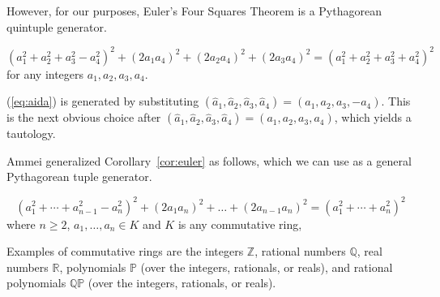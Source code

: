 \documentclass[12pt]{article}
\begin{document}
However, for our purposes, 
Euler's Four Squares Theorem is a Pythagorean quintuple generator.

\begin{corollary}
\label{cor:euler}
\begin{equation}
\label{eq:aida}
(a_1^2 + a_2^2 + a_3^2 - a_4^2)^2 + (2a_1a_4)^2 + (2a_2a_4)^2 + (2a_3a_4)^2
= (a_1^2 + a_2^2 + a_3^2 + a_4^2)^2
\end{equation}
for any integers $a_1,a_2,a_3,a_4$.
\end{corollary}
\prf
(\ref{eq:aida}) is generated by substituting 
$(\hat{a}_1,\hat{a}_2,\hat{a}_3,\hat{a}_4) = (a_1,a_2,a_3,-a_4)$.
This is the next obvious choice after 
$(\hat{a}_1,\hat{a}_2,\hat{a}_3,\hat{a}_4) = (a_1,a_2,a_3,a_4)$,
which yields a tautology.
\QED

Ammei \cite{dickson52} %
generalized Corollary~\ref{cor:euler} as follows,
which we can use as a general Pythagorean tuple generator.

\begin{lemma}[Ammei]	%
\label{lem:ammei}
\begin{equation}
\label{eq:ammei}
(a_1^2 + \cdots + a_{n-1}^2 - a_n^2)^2 + (2a_1a_n)^2 + \ldots + (2a_{n-1}a_n)^2 
= (a_1^2 + \cdots + a_n^2)^2
\end{equation}
where $n \geq 2$, $a_1,\ldots,a_n \in K$ and $K$ is any commutative ring, 
\end{lemma}

Examples of commutative rings are the integers $\mathbb{Z}$, 
rational numbers $\mathbb{Q}$, real numbers $\mathbb{R}$, polynomials $\mathbb{P}$
(over the integers, rationals, or reals),
and rational polynomials $\mathbb{QP}$ (over the integers, rationals, or reals).
\end{document}
